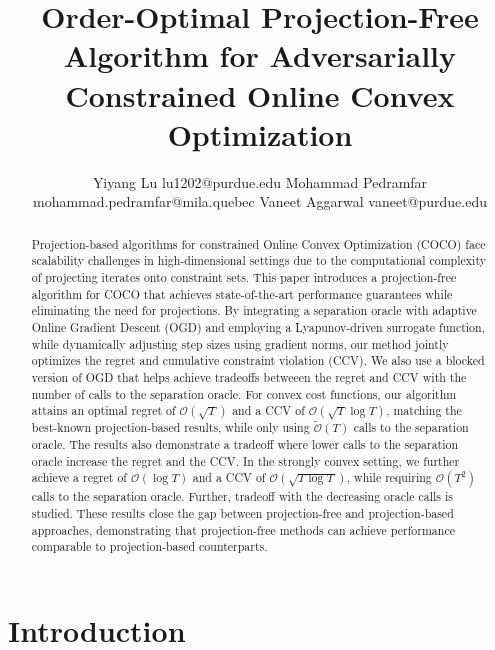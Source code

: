 \documentclass[twoside,11pt,]{article}
\begin{document}
\title{Order-Optimal Projection-Free Algorithm for Adversarially Constrained Online Convex Optimization}

\author{\name Yiyang Lu \email lu1202@purdue.edu 
        \AND
        \name Mohammad Pedramfar \email mohammad.pedramfar@mila.quebec 
        \AND
        \name Vaneet Aggarwal \email vaneet@purdue.edu
        }
\editor{}

\maketitle

\begin{abstract}

Projection-based algorithms for constrained Online Convex Optimization (COCO) face scalability challenges in high-dimensional settings due to the computational complexity of projecting iterates onto constraint sets. This paper introduces a projection-free algorithm for COCO that achieves state-of-the-art performance guarantees while eliminating the need for projections. 
By integrating a separation oracle with adaptive Online Gradient Descent (OGD) and employing a Lyapunov-driven surrogate function, while dynamically adjusting step sizes using gradient norms, our method jointly optimizes the regret and cumulative constraint violation (CCV).
We also use a blocked version of OGD that helps achieve tradeoffs betweeen the regret and CCV with the number of calls to the separation oracle. For convex cost functions, our algorithm attains an optimal regret of $\mathcal{O}(\sqrt{T})$  and a CCV of $\mathcal{O}(\sqrt{T} \log T)$, matching the best-known projection-based results, while only using $\tilde{\mathcal{O}}({T})$ calls to the separation oracle. The results also demonstrate a tradeoff where lower calls to the separation oracle increase the regret and the CCV. In the strongly convex setting, we further achieve a regret of $\mathcal{O}(\log T)$  and a CCV of  $\mathcal{O}(\sqrt{T\log T} )$, while requiring ${\mathcal{O}}({T}^2)$ calls to the separation oracle. Further, tradeoff with the decreasing oracle calls is studied. These results close the gap between projection-free and projection-based approaches, demonstrating that projection-free methods can achieve performance comparable to projection-based counterparts.

\end{abstract}

\section{Introduction}
\end{document}
